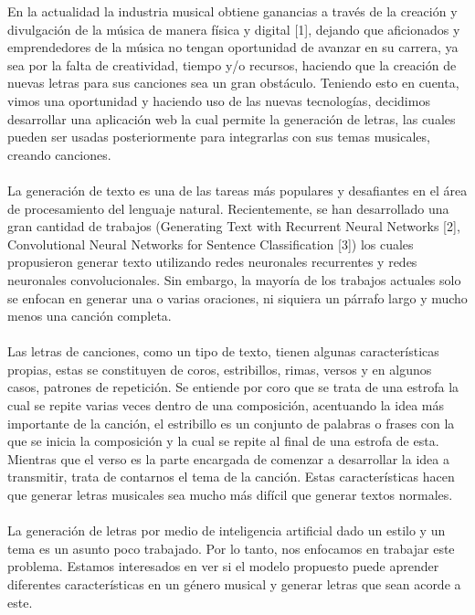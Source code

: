   En la actualidad la industria musical obtiene ganancias a través
  de la creación y divulgación de la música de manera física y digital [1],
  dejando que aficionados y emprendedores de la música no tengan oportunidad
  de avanzar en su carrera, ya sea por la falta de creatividad, tiempo y/o recursos,
  haciendo que la creación de nuevas letras para sus canciones sea un gran obstáculo.
  Teniendo esto en cuenta, vimos una oportunidad y haciendo uso de las nuevas tecnologías,
  decidimos desarrollar una aplicación web la cual permite la generación de letras,
  las cuales pueden ser usadas posteriormente para integrarlas con sus temas musicales,
  creando canciones.\\\\
  La generación de texto es una de las tareas más populares y desafiantes en el área de
  procesamiento del lenguaje natural. Recientemente, se han desarrollado una gran cantidad
  de trabajos (Generating Text with Recurrent Neural Networks [2], Convolutional Neural Networks
  for Sentence Classification [3]) los cuales propusieron generar texto utilizando redes
  neuronales recurrentes y redes neuronales convolucionales. Sin embargo, la mayoría de los
  trabajos actuales solo se enfocan en generar una o varias oraciones, ni siquiera un párrafo
  largo y mucho menos una canción completa.\\\\
  Las letras de canciones, como un tipo de texto, tienen algunas características propias,
  estas se constituyen de coros, estribillos, rimas, versos y en algunos casos, patrones de
  repetición. Se entiende por coro que se trata de una estrofa la cual se repite varias
  veces dentro de una composición, acentuando la idea más importante de la canción, el
  estribillo es un conjunto de palabras o frases con la que se inicia la composición y
  la cual se repite al final de una estrofa de esta. Mientras que el verso es la parte
  encargada de comenzar a desarrollar la idea a transmitir, trata de contarnos el tema
  de la canción. Estas características hacen que generar letras musicales sea mucho más
  difícil que generar textos normales.\\\\
  La generación de letras por medio de inteligencia artificial dado un estilo y un tema
  es un asunto poco trabajado. Por lo tanto, nos enfocamos en trabajar este problema.
  Estamos interesados en ver si el modelo propuesto puede aprender diferentes características en
  un género musical y generar letras que sean acorde a este.
  